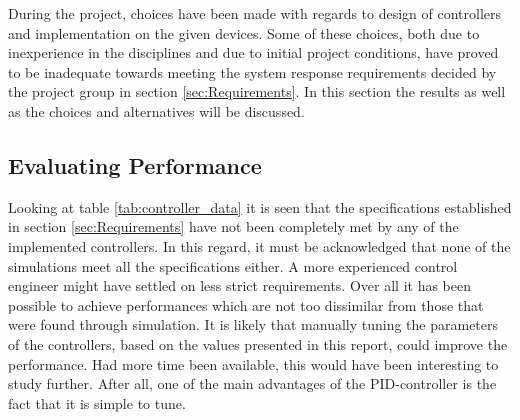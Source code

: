 \documentclass[../../main.tex]{subfiles}
\begin{document}

During the project, choices have been made with regards to design of controllers and implementation on the given devices. Some of these choices, both due to inexperience in the disciplines and due to initial project conditions, have proved to be inadequate towards meeting the system response requirements decided by the project group in section \ref{sec:Requirements}. In this section the results as well as the choices and alternatives will be discussed.

\subsection{Evaluating Performance}

Looking at table \ref{tab:controller_data} it is seen that the specifications established in section \ref{sec:Requirements} have not been completely met by any of the implemented controllers. In this regard, it must be acknowledged that none of the simulations meet all the specifications either. A more experienced control engineer might have settled on less strict requirements.
Over all it has been possible to achieve performances which are not too dissimilar from those that were found through simulation. It is likely that manually tuning the parameters of the controllers, based on the values presented in this report, could improve the performance. Had more time been available, this would have been interesting to study further. After all, one of the main advantages of the PID-controller is the fact that it is simple to tune. 
\end{document}
